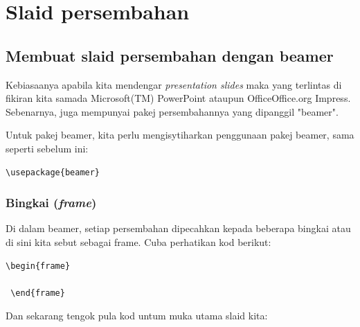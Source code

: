 \chapter{Slaid persembahan}

\section{Membuat slaid persembahan dengan \latex{} beamer}
Kebiasaanya apabila kita mendengar \emph{presentation slides} maka yang terlintas di fikiran kita samada Microsoft(TM) PowerPoint ataupun OfficeOffice.org Impress.
Sebenarnya, \latex{} juga mempunyai pakej persembahannya yang dipanggil \mbox{"}beamer\mbox{"}.

Untuk pakej beamer, kita perlu mengisytiharkan penggunaan pakej beamer, sama seperti sebelum ini:\\

\begin{Verbatim}[frame=single]
 \usepackage{beamer}
\end{Verbatim}

\subsection{Bingkai (\emph{frame})}
Di dalam beamer, setiap persembahan dipecahkan kepada beberapa bingkai atau di sini kita sebut sebagai frame. 
Cuba perhatikan kod berikut:


\begin{Verbatim}[frame=single]
 \begin{frame}
  
 \end{frame}
\end{Verbatim}

Dan sekarang tengok pula kod untum muka utama slaid kita:

